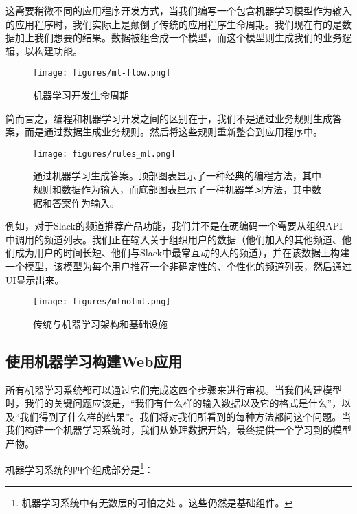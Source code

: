 \documentclass[Chinese, 11pt, table]{diazessay} %
\begin{document}
\begin{CJK}{UTF8}{gbsn}
\begin{sloppypar}
这需要稍微不同的应用程序开发方式，当我们编写一个包含机器学习模型作为输入的应用程序时，我们实际上是颠倒了传统的应用程序生命周期。我们现在有的是数据加上我们想要的结果。数据被组合成一个模型，而这个模型则生成我们的业务逻辑，以构建功能。

\begin{figure}[H]
\centering
\texttt{[image: figures/ml-flow.png]}
\caption{机器学习开发生命周期}
\end{figure}

简而言之，编程和机器学习开发之间的区别在于，我们不是通过业务规则生成答案，而是通过数据生成业务规则。然后将这些规则重新整合到应用程序中。

\begin{figure}[H]
\centering
\texttt{[image: figures/rules\_ml.png]}
\caption{通过机器学习生成答案。顶部图表显示了一种经典的编程方法，其中规则和数据作为输入，而底部图表显示了一种机器学习方法，其中数据和答案作为输入。 \citep{chollet2021deep}}
\end{figure}

例如，对于Slack的频道推荐产品功能，我们并不是在硬编码一个需要从组织API中调用的频道列表。我们正在输入关于组织用户的数据（他们加入的其他频道、他们成为用户的时间长短、他们与Slack中最常互动的人的频道），并在该数据上构建一个模型，该模型为每个用户推荐一个非确定性的、个性化的频道列表，然后通过UI显示出来。

\begin{figure}[H]
\centering
\texttt{[image: figures/mlnotml.png]}
\caption{传统与机器学习架构和基础设施}
\end{figure}

\subsection{使用机器学习构建Web应用}

所有机器学习系统都可以通过它们完成这四个步骤来进行审视。当我们构建模型时，我们的关键问题应该是，“我们有什么样的输入数据以及它的格式是什么”，以及“我们得到了什么样的结果”。我们将对我们所看到的每种方法都问这个问题。当我们构建一个机器学习系统时，我们从处理数据开始，最终提供一个学习到的模型产物。

机器学习系统的四个组成部分是\footnote{机器学习系统中有无数层的可怕之处 \citep{kreuzberger2022machine}。这些仍然是基础组件。}：


\end{sloppypar}
\end{CJK}
\end{document}
